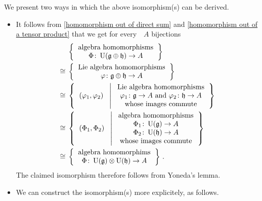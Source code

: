 \begin{example}
	We present two ways in which the above isomorphism(s) can be derived.
	\begin{itemize}
		\item
			It follows from \cref{homomorphism out of direct sum} and \cref{homomorphism out of a tensor product} that we get for every~\algebra{$\kf$}~$A$ bijections
			\begin{align*}
				{}&
				\left\{
					\begin{tabular}{c}
						algebra homomorphisms \\
						$\Phi \colon \Univ(\glie \oplus \hlie) \to A$
					\end{tabular}
				\right\}
				\\
				\cong{}&
				\left\{
					\begin{tabular}{c}
						Lie~algebra homomorphisms \\
						$\varphi \colon \glie \oplus \hlie \to A$
					\end{tabular}
				\right\}
				\\
				\cong{}&
				\left\{
					\begin{tabular}{c}
						$( \varphi_1, \varphi_2 )$
					\end{tabular}
				\suchthat*
					\begin{tabular}{c}
						Lie~algebra homomorphisms \\
						$\varphi_1 \colon \glie \to A$ and~$\varphi_2 \colon \hlie \to A$ \\
						whose images commute
					\end{tabular}
				\right\}
				\\
				\cong{}&
				\left\{
					\begin{tabular}{c}
						$(\Phi_1, \Phi_2)$
					\end{tabular}
				\suchthat*
					\begin{tabular}{c}
						algebra homomorphisms               \\
						$\Phi_1 \colon \Univ(\glie) \to A$  \\
						$\Phi_2 \colon \Univ(\hlie) \to A$  \\
						whose images commute
					\end{tabular}
				\right\}
				\\
				\cong{}&
				\left\{
					\begin{tabular}{c}
						 algebra homomorphims \\
						 $\Phi \colon \Univ(\glie) \tensor \Univ(\hlie) \to A$
					\end{tabular}
				\right\} \,.
			\end{align*}
			The claimed isomorphism therefore follows from Yoneda’s lemma.
		\item
			We can construct the isomorphism(s) more explicitely, as follows.


\end{itemize}
\end{example}
